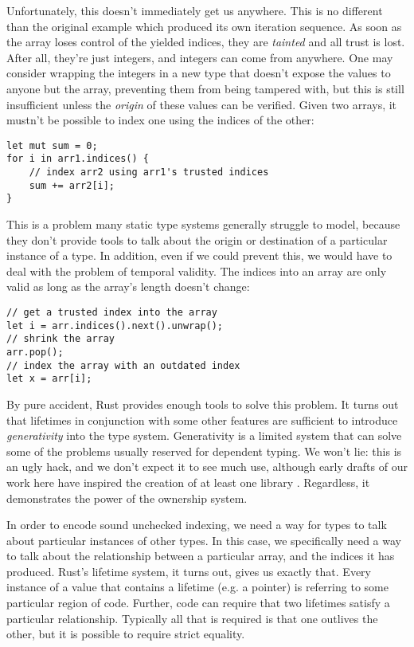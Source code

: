 Unfortunately, this doesn't immediately get us anywhere. This is no different
than the original example which produced its own iteration sequence. As soon
as the array loses control of the yielded indices, they are \emph{tainted} and all
trust is lost. After all, they're just integers, and integers can come from anywhere.
One may consider wrapping the integers in a new type that doesn't
expose the values to anyone but the array, preventing them from being
tampered with, but this is still insufficient unless the \emph{origin} of
these values can be verified. Given two arrays, it mustn't be possible to index
one using the indices of the other:

\begin{verbatim}
let mut sum = 0;
for i in arr1.indices() {
    // index arr2 using arr1's trusted indices
    sum += arr2[i];
}
\end{verbatim}

This is a problem many static type systems generally struggle to model, because
they don't provide tools to talk about the origin or destination of a particular
instance of a type. In addition, even if we could prevent this, we would have to
deal with the problem of temporal validity. The indices into an array are only
valid as long as the array's length doesn't change:

\begin{verbatim}
// get a trusted index into the array
let i = arr.indices().next().unwrap();
// shrink the array
arr.pop();
// index the array with an outdated index
let x = arr[i];
\end{verbatim}

By pure accident, Rust provides enough tools to solve
this problem. It turns out that lifetimes in conjunction with some other features
are sufficient to introduce \emph{generativity} into the type system. Generativity is
a limited system that can solve some of the problems usually reserved for
dependent typing. We won't lie: this is an ugly hack, and we don't expect it
to see much use, although early drafts of our work here have inspired the creation
of at least one library \cite{bluss-indexing}. Regardless, it demonstrates the power of
the ownership system.

In order to encode sound unchecked indexing, we need a way for types to talk about
particular instances of other types. In this case, we specifically need a way
to talk about the relationship between a particular array, and the indices it has
produced. Rust's lifetime system, it turns out, gives us exactly that. Every
instance of a value that contains a lifetime (e.g. a pointer) is referring to
some particular region of code. Further, code can require that two lifetimes
satisfy a particular relationship. Typically all that is required is that
one outlives the other, but it is possible to require strict equality.

